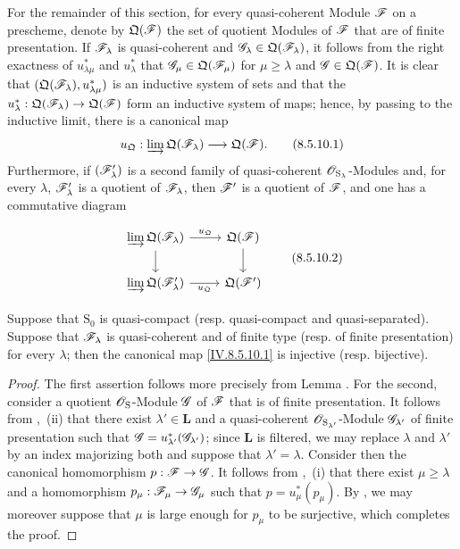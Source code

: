 \begin{env}[8.5.10]
\label{IV.8.5.10}
For the remainder of this section, for every quasi-coherent Module $\mathscr{F}$ on a prescheme, denote by $\mathfrak{Q}(\mathscr{F})$ the set of quotient Modules of $\mathscr{F}$ that are of finite presentation. If $\mathscr{F}_\lambda$ is quasi-coherent and $\mathscr{G}_\lambda\in\mathfrak{Q}(\mathscr{F}_\lambda)$, it follows from the right exactness of $u_{\lambda\mu}^*$ and $u_\lambda^*$ that $\mathscr{G}_\mu\in\mathfrak{Q}(\mathscr{F}_\mu)$ for $\mu\geqslant\lambda$ and $\mathscr{G}\in\mathfrak{Q}(\mathscr{F})$. It is clear that $(\mathfrak{Q}(\mathscr{F}_\lambda),u_{\lambda\mu}^*)$ is an inductive system of sets and that the $u_\lambda^*:\mathfrak{Q}(\mathscr{F}_\lambda)\to\mathfrak{Q}(\mathscr{F})$ form an inductive system of maps; hence, by passing to the inductive limit, there is a canonical map
\[
u_{\mathfrak{Q}}:\varinjlim\mathfrak{Q}(\mathscr{F}_\lambda)\longrightarrow\mathfrak{Q}(\mathscr{F}).
\tag{8.5.10.1}\label{IV.8.5.10.1}
\]
Furthermore, if $(\mathscr{F}'_\lambda)$ is a second family of quasi-coherent $\mathscr{O}_{\mathrm{S}_\lambda}$-Modules and, for every $\lambda$, $\mathscr{F}'_\lambda$ is a quotient of $\mathscr{F}_\lambda$, then $\mathscr{F}'$ is a quotient of $\mathscr{F}$, and one has a commutative diagram


\[
\begin{tikzcd}
\varinjlim\mathfrak{Q}(\sh{F}_\lambda) \ar[r,"u_{\mathfrak{Q}}"] \ar[d] & \mathfrak{Q}(\sh{F}) \ar[d] \\
\varinjlim\mathfrak{Q}(\sh{F}'_\lambda) \ar[r,"u_{\mathfrak{Q}}"'] & \mathfrak{Q}(\sh{F}')
\end{tikzcd}
\tag{8.5.10.2}\label{IV.8.5.10.2}
\]
\end{env}

\begin{proposition}[8.5.11]
\label{IV.8.5.11}
Suppose that $\mathrm{S}_0$ is quasi-compact (resp. quasi-compact and quasi-separated). Suppose that $\mathscr{F}_\lambda$ is quasi-coherent and of finite type (resp. of finite presentation) for every $\lambda$; then the canonical map \eqref{IV.8.5.10.1} is injective (resp. bijective).
\end{proposition}

\begin{proof}
The first assertion follows more precisely from Lemma . For the second, consider a quotient $\mathscr{O}_{\mathrm{S}}$-Module $\mathscr{G}$ of $\mathscr{F}$ that is of finite presentation. It follows from ,~(ii) that there exist $\lambda'\in\mathbf{L}$ and a quasi-coherent $\mathscr{O}_{\mathrm{S}_{\lambda'}}$-Module $\mathscr{G}_{\lambda'}$ of finite presentation such that $\mathscr{G}=u_{\lambda'}^*(\mathscr{G}_{\lambda'})$; since $\mathbf{L}$ is filtered, we may replace $\lambda$ and $\lambda'$ by an index majorizing both and suppose that $\lambda'=\lambda$. Consider then the canonical homomorphism $p:\mathscr{F}\to\mathscr{G}$. It follows from ,~(i) that there exist $\mu\geqslant\lambda$ and a homomorphism $p_\mu:\mathscr{F}_\mu\to\mathscr{G}_\mu$ such that $p=u_\mu^*(p_\mu)$. By , we may moreover suppose that $\mu$ is large enough for $p_\mu$ to be surjective, which completes the proof.
\end{proof}

